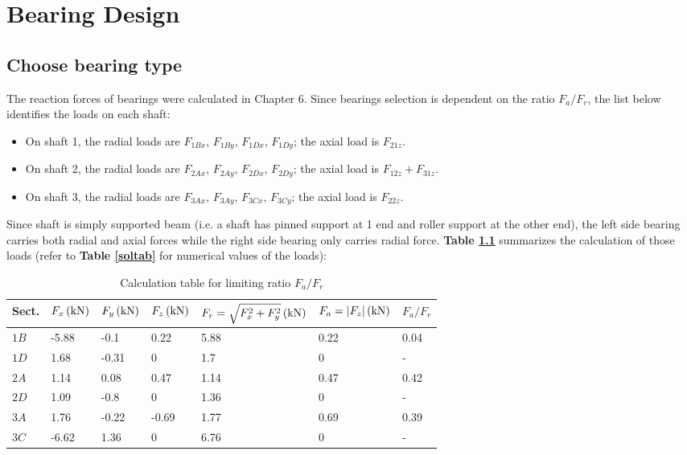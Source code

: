 \chapter{Bearing Design}

\section{Choose bearing type}
The reaction forces of bearings were calculated in Chapter 6. Since bearings selection is dependent on the ratio $ F_a/F_r $, the list below identifies the loads on each shaft:
\begin{itemize}
	\item On shaft 1, the radial loads are $ F_{1Bx} $, $ F_{1By} $, $ F_{1Dx} $, $ F_{1Dy} $; the axial load is $ F_{21z} $.
	\item On shaft 2, the radial loads are $ F_{2Ax} $, $ F_{2Ay} $, $ F_{2Dx} $, $ F_{2Dy} $; the axial load is $ F_{12z} + F_{31z} $.
	\item On shaft 3, the radial loads are $ F_{3Ax} $, $ F_{3Ay} $, $ F_{3Cx} $, $ F_{3Cy} $; the axial load is $ F_{22z} $.
\end{itemize}

Since shaft is simply supported beam (i.e. a shaft has pinned support at 1 end and roller support at the other end), the left side bearing carries both radial and axial forces while the right side bearing only carries radial force. \textbf{Table \ref{Fr/Fa}} summarizes the calculation of those loads (refer to \textbf{Table \ref{soltab}} for numerical values of the loads):

\begin{table}[ht]
	\centering
	\caption{Calculation table for limiting ratio $ F_a/F_r $}
	\begin{tabular}{lllllll}\toprule
		Sect. & $ F_x \, (\mathrm{kN}) $ & $ F_y \, (\mathrm{kN}) $ & $ F_z \, (\mathrm{kN}) $ & $ F_r = \sqrt{F_x^2+F_y^2} \, (\mathrm{kN}) $ & $ F_a = |F_z| \, (\mathrm{kN}) $ & $ F_a/F_r $ \\ \midrule
		$ 1B $ & -5.88 & -0.1 & 0.22 & 5.88 & 0.22 & 0.04 \\
		$ 1D $ & 1.68 & -0.31 & 0 & 1.7 & 0 & - \\
		$ 2A $ & 1.14 & 0.08 & 0.47 & 1.14 & 0.47 & 0.42 \\
		$ 2D $ & 1.09 & -0.8 & 0 & 1.36 & 0 & - \\
		$ 3A $ & 1.76 & -0.22 & -0.69 & 1.77 & 0.69 & 0.39 \\
		$ 3C $ & -6.62 & 1.36 & 0 & 6.76 & 0 & -\\
		\bottomrule
	\end{tabular}
	\label{Fr/Fa}
\end{table}

